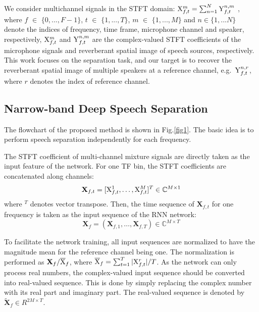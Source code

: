 \documentclass{article}
\begin{document}
We consider multichannel signals in the STFT domain: ${\rm X}_{f,t}^{m} = \sum_{n=1}^N {\rm Y}_{f,t}^{n,m}$
, where $f$ $\in$ $\{0,...,F-1\}$, $t$ $\in$ $\{1, ..., T\}$, $m$ $\in$ $\{1,...,M\}$ and $n\in \{1,...N\}$ denote the indices of frequency, time frame, microphone channel and speaker, respectively,
${\rm X}_{f,t}^{m}$ and ${\rm Y}_{f,t}^{n,m}$ are the complex-valued STFT coefficients of the microphone signals and reverberant spatial image of speech sources, respectively.
This work focuses on the separation task, and our target is to recover the reverberant spatial image of multiple speakers at a reference channel, e.g.\ ${\rm Y}_{f,t}^{n,r}$, where $r$ denotes the index of reference channel.

\subsection{Narrow-band Deep Speech Separation}

The flowchart of the proposed method is shown in Fig.\ref{fig1}.
The basic idea is to perform speech separation independently for each frequency.

The STFT coefficient of multi-channel mixture signals are directly taken as the input feature of the network. For one TF bin, the STFT coefficients are concatenated along channels:
\begin{equation}
\mathbf{X}_{f,t} = [{\rm X}_{f,t}^1,\dots,{\rm X}_{f,t}^M]^{T} \in \mathbb{C}^{M\times 1}
\end{equation}
where $^{T}$ denotes vector transpose. Then, the time sequence of $\mathbf{X}_{f,t}$ for one frequency is taken as the input sequence of the RNN network:
\begin{equation}
\mathbf{X}_{f} = (\mathbf{X}_{f,1},\dots,\mathbf{X}_{f,T}) \in \mathbb{C}^{M\times T}
\end{equation}

To facilitate the network training, all input sequences are normalized to have the magnitude mean for the reference channel being one. The normalization is performed as $\mathbf{X}_{f}/ \overline{{\rm X}}_f$, where $\overline{{\rm X}}_{f} = \textstyle\sum_{t=1}^T |{\rm X}_{f,t}^r|/T$.
As the network can only process real numbers, the complex-valued input sequence should be converted into real-valued sequence.
This is done by simply replacing the complex number with its real part and imaginary part.
The real-valued sequence is denoted by $\widetilde{\mathbf{X}}_{f}\in R^{2M\times T}$.
\end{document}

